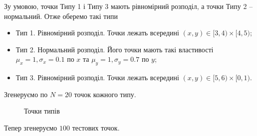 \documentclass[a4paper,12pt]{article}
\begin{document}
Зу умовою, точки Типу 1 і Типу 3 мають рівномірний розподіл, а точки Типу 2 -- нормальний. Отже оберемо такі типи
\begin{itemize}
	\item Тип 1. Рівномірний розподіл. Точки лежать всередині $(x,y) \in [3,4) \times [4,5)$;
	\item Тип 2. Нормальний розподіл. Його точки мають такі властивості  $\mu_x = 1, \sigma_x = 0.1$ по $x$ та $\mu_y = 1, \sigma_y = 0.7$ по $y$;
	\item Тип 3. Рівномірний розподіл. Точки лежать всередині $(x,y) \in [5,6) \times [0,1)$.
\end{itemize}

Згенеруємо по $N=20$ точок кожного типу.

\begin{figure}[h!]
	\caption{Точки типів}
\end{figure}

Тепер згенеруємо $100$ тестових точок.
\end{document}
